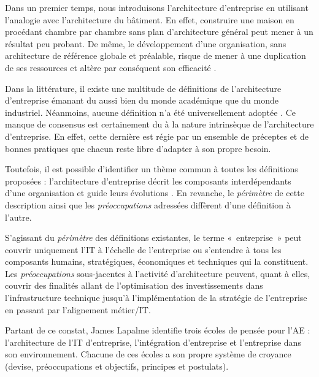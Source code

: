 Dans un premier temps, nous introduisons  l'architecture d'entreprise en utilisant l'analogie avec l'architecture du bâtiment. En effet, construire une maison en 
procédant chambre par chambre sans plan d'architecture général peut mener à un résultat peu probant. De même, le développement d'une organisation, sans architecture de référence globale et préalable, risque de mener à une duplication de ses ressources et altère par conséquent son efficacité \cite{bernard2012introduction}.

Dans la littérature, il existe une multitude de définitions de l'architecture d'entreprise émanant du aussi bien du monde académique que du monde industriel. 
Néanmoins, aucune définition n'a été universellement adoptée \cite{mentz2012comparison} \cite{ranganathan2005enterprise}. Ce manque de consensus est certainement du à la nature intrinsèque de l'architecture d'entreprise. En effet, cette dernière est 
régie par un ensemble de préceptes et de bonnes pratiques que chacun reste libre d'adapter à son propre besoin. 

Toutefois, il est possible d'identifier un thème commun à toutes les définitions proposées : l'architecture d'entreprise décrit les composants interdépendants d'une organisation et guide leurs évolutions \cite{lapalme2012three}. En revanche, le 
\textit{périmètre} de cette description ainsi que les \textit{préoccupations} adressées diffèrent d'une définition à l'autre.

S'agissant du \textit{périmètre} des définitions existantes, le terme 
«~entreprise~» peut couvrir uniquement l'IT à l'échelle de l'entreprise ou s'entendre à tous les composants humains, stratégiques, économiques et techniques qui la 
constituent. Les \textit{préoccupations} sous-jacentes à l'activité d'architecture peuvent, quant à elles, couvrir des finalités allant de l'optimisation des investissements dans l'infrastructure technique jusqu'à 
l'implémentation de la stratégie de l'entreprise en passant par l'alignement métier/IT. 

Partant de ce constat, James Lapalme identifie trois écoles de pensée pour l'AE 
\cite{lapalme2012three} : l'architecture de l'IT d'entreprise, l'intégration 
d'entreprise et l'entreprise dans son environnement. Chacune de ces écoles a son propre système de croyance (devise, préoccupations et objectifs, principes et postulats).



